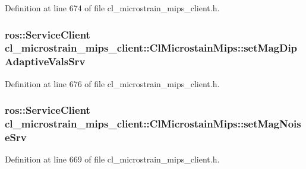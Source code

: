 Definition at line 674 of file cl\+\_\+microstrain\+\_\+mips\+\_\+client.\+h.

\subsubsection[{\texorpdfstring{set\+Mag\+Dip\+Adaptive\+Vals\+Srv}{setMagDipAdaptiveValsSrv}}]{\setlength{\rightskip}{0pt plus 5cm}ros\+::\+Service\+Client cl\+\_\+microstrain\+\_\+mips\+\_\+client\+::\+Cl\+Microstain\+Mips\+::set\+Mag\+Dip\+Adaptive\+Vals\+Srv\hspace{0.3cm}{\ttfamily [protected]}}\hypertarget{classcl__microstrain__mips__client_1_1ClMicrostainMips_a05a95ac9c62fde0b9298cac2d73f2671}{}\label{classcl__microstrain__mips__client_1_1ClMicrostainMips_a05a95ac9c62fde0b9298cac2d73f2671}


Definition at line 676 of file cl\+\_\+microstrain\+\_\+mips\+\_\+client.\+h.

\subsubsection[{\texorpdfstring{set\+Mag\+Noise\+Srv}{setMagNoiseSrv}}]{\setlength{\rightskip}{0pt plus 5cm}ros\+::\+Service\+Client cl\+\_\+microstrain\+\_\+mips\+\_\+client\+::\+Cl\+Microstain\+Mips\+::set\+Mag\+Noise\+Srv\hspace{0.3cm}{\ttfamily [protected]}}\hypertarget{classcl__microstrain__mips__client_1_1ClMicrostainMips_abf0b2a8818a8936e6aae2d9ac1f0e6a8}{}\label{classcl__microstrain__mips__client_1_1ClMicrostainMips_abf0b2a8818a8936e6aae2d9ac1f0e6a8}


Definition at line 669 of file cl\+\_\+microstrain\+\_\+mips\+\_\+client.\+h.

